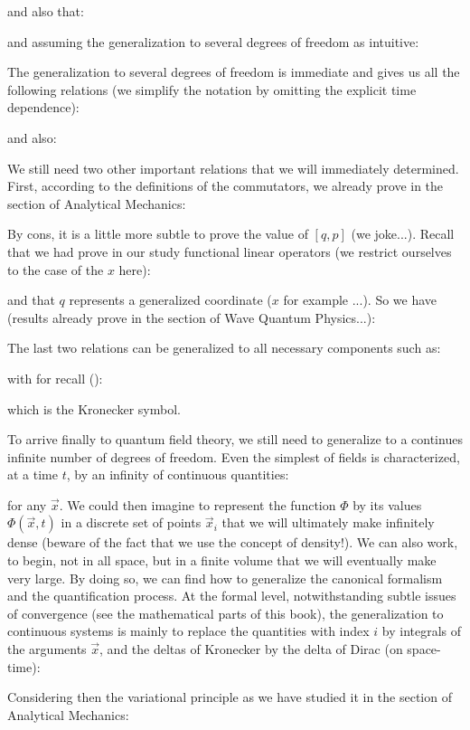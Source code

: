 	and also that:
	
	and assuming the generalization to several degrees of freedom as intuitive:
	
	The generalization to several degrees of freedom is immediate and gives us all the following relations (we simplify the notation by omitting the explicit time dependence):
	
	 and also:
	
	We still need two other important relations that we will immediately determined. First, according to the definitions of the commutators, we already prove in the section of Analytical Mechanics:
	
	By cons, it is a little more subtle to prove the value of $[q,p]$ (we joke...). Recall that we had prove in our study functional linear operators (we restrict ourselves to the case of the $x$ here):
	
	and that $q$ represents a generalized coordinate ($x$ for example ...). So we have (results already prove in the section of Wave Quantum Physics...):
	
	The last two relations can be generalized to all necessary components such as:
	
	with for recall ():
	
	which is the Kronecker symbol.
	
	To arrive finally to quantum field theory, we still need to generalize to a continues infinite number of degrees of freedom. Even the simplest of fields is characterized, at a time $t$, by an infinity of continuous quantities:
	
	for any $\vec{x}$. We could then imagine to represent the function $\Phi$ by its values $\Phi(\vec{x},t)$ in a discrete set of points $\vec{x}_i$ that we will ultimately make infinitely dense (beware of the fact that we use the concept of density!). We can also work, to begin, not in all space, but in a finite volume that we will eventually make very large. By doing so, we can find how to generalize the canonical formalism and the quantification process. At the formal level, notwithstanding subtle issues of convergence (see the mathematical parts of this book), the generalization to continuous systems is mainly to replace the quantities with index $i$ by integrals of the arguments $\vec{x}$, and the deltas of Kronecker by the delta of Dirac (on space-time):
	
	Considering then the variational principle as we have studied it in the section of Analytical Mechanics:
	
